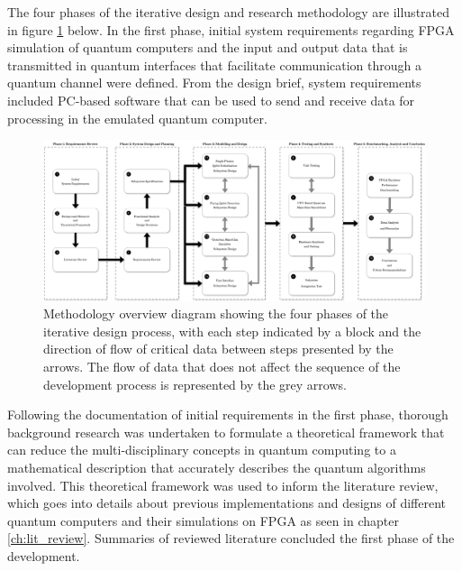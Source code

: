 The four phases of the iterative design and research methodology are illustrated in figure \ref{fig:methodology-phases} below. In the first phase, initial system requirements regarding FPGA simulation of quantum computers and the input and output data that is transmitted in quantum interfaces that facilitate communication through a quantum channel were defined. From the design brief, system requirements included PC-based software that can be used to send and receive data for processing in the emulated quantum computer.    
\begin{figure}[!ht]
	\centering
	\includegraphics[width=1.0\linewidth]{body/ch4/figs/methodology-phases}
	\caption[Methodology Overview Diagram.]{Methodology overview diagram showing the four phases of the iterative design process, with each step indicated by a block and the direction of flow of critical data between steps presented by the arrows. The flow of data that does not affect the sequence of the development process is represented by the grey arrows.}
	\label{fig:methodology-phases}
\end{figure}
Following the documentation of initial requirements in the first phase, thorough background research was undertaken to formulate a theoretical framework that can reduce the multi-disciplinary concepts in quantum computing to a mathematical description that accurately describes the quantum algorithms involved. This theoretical framework was used to inform the literature review, which goes into details about previous implementations and designs of different quantum computers and their simulations on FPGA as seen in chapter \ref{ch:lit_review}. Summaries of reviewed literature concluded the first phase of the development.

